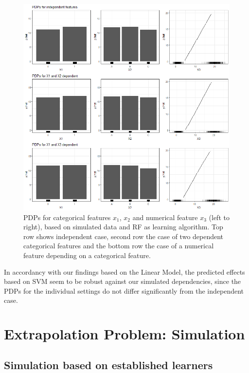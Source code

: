 \documentclass[]{krantz}
\begin{document}
\begin{figure}

\includegraphics[width=1\linewidth]{images/VK_PDP_24_Set4_SVM} \hfill{}

\caption{PDPs for categorical features $x_1$, $x_2$ and numerical feature $x_3$ (left to right), based on simulated data and RF as learning algorithm. Top row shows independent case, second row the case of two dependent categorical features and the bottom row the case of a numerical feature depending on a categorical feature.}\label{fig:Figure24}
\end{figure}

In accordancy with our findings based on the Linear Model, the predicted
effects based on SVM seem to be robust against our simulated
dependencies, since the PDPs for the individual settings do not differ
significantly from the independent case.

\section{Extrapolation Problem: Simulation}\label{ExtrapolationProblem}

\subsection{Simulation based on established
learners}\label{ExtrapolationProblemEstablished}
\end{document}
